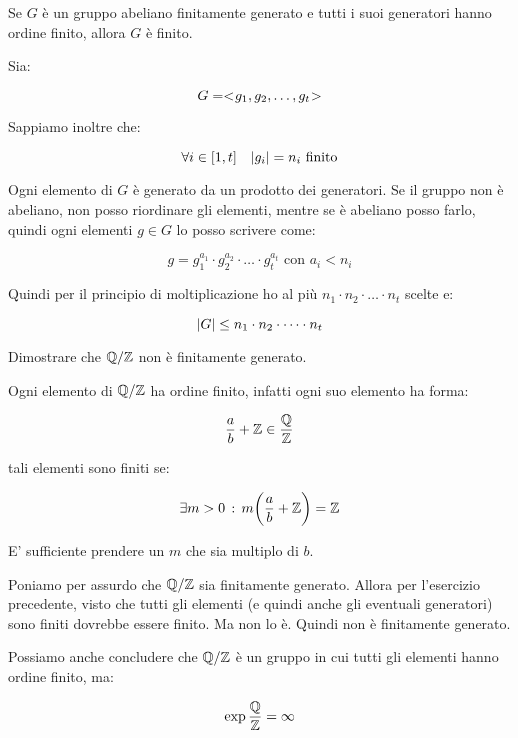 \begin{esercizio}
	Se $G$ è un gruppo abeliano finitamente generato e tutti i suoi generatori hanno ordine finito, allora $G$ è finito.
\end{esercizio}
\begin{soluzione}
	Sia:
	
	\begin{equation}
		G = < \negmedspace g_1, g_2, \dots, g_t \negmedspace >
	\end{equation}

	Sappiamo inoltre che:
	
	\begin{equation}
		\forall i \in [1, t] \quad \lvert g_i \rvert = n_i \text{ finito}
	\end{equation}

	Ogni elemento di $G$ è generato da un prodotto dei generatori. Se il gruppo non è abeliano, non posso riordinare gli elementi, mentre se è abeliano posso farlo, quindi ogni elementi $g \in G$ lo posso scrivere come:
	
	\begin{equation}
		g = g_1^{a_1} \cdot g_2^{a_2} \cdot \dots \cdot g_t^{a_t} \text{ con $a_i < n_i$}
	\end{equation}

	Quindi per il principio di moltiplicazione ho al più $n_1 \cdot n_2 \cdot \dots \cdot n_t$ scelte e:
	
	\begin{equation}
		\lvert G \rvert \le n_1 \cdot n_2 \cdot \dots \cdot n_t
	\end{equation}
\end{soluzione}

\begin{esercizio}
	Dimostrare che $\mathbb{Q}/\mathbb{Z}$ non è finitamente generato.
\end{esercizio}
\begin{soluzione}
	Ogni elemento di $\mathbb{Q}/\mathbb{Z}$ ha ordine finito, infatti ogni suo elemento ha forma:
	
	\begin{equation}
		\frac{a}{b} + \mathbb{Z} \in \dfrac{\mathbb{Q}}{\mathbb{Z}} 
	\end{equation}

	tali elementi sono finiti se:
	
	\begin{equation}
		\exists m > 0 \,:\, m\biggl( \frac{a}{b} + \mathbb{Z} \biggr) = \mathbb{Z}
	\end{equation}

	E' sufficiente prendere un $m$ che sia multiplo di $b$.
	
	Poniamo per assurdo che $\mathbb{Q}/\mathbb{Z}$ sia finitamente generato. Allora per l'esercizio precedente, visto che tutti gli elementi (e quindi anche gli eventuali generatori) sono finiti dovrebbe essere finito. Ma non lo è. Quindi non è finitamente generato.
\end{soluzione}

Possiamo anche concludere che $\mathbb{Q}/\mathbb{Z}$ è un gruppo in cui tutti gli elementi hanno ordine finito, ma:

\begin{equation}
	\exp \dfrac{\mathbb{Q}}{\mathbb{Z}} = \infty
\end{equation}